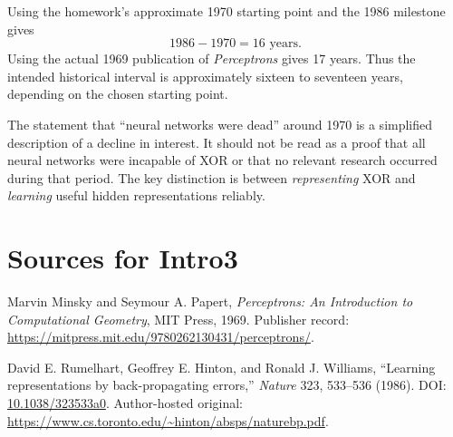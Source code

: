 \documentclass[11pt,a4paper]{article}
\begin{document}
Using the homework's approximate 1970 starting point and the 1986 milestone gives
\[
1986-1970=\boxed{16\text{ years}}.
\]
Using the actual 1969 publication of \emph{Perceptrons} gives 17 years. Thus the intended historical interval is approximately sixteen to seventeen years, depending on the chosen starting point.

The statement that ``neural networks were dead'' around 1970 is a simplified description of a decline in interest. It should not be read as a proof that all neural networks were incapable of XOR or that no relevant research occurred during that period. The key distinction is between \emph{representing} XOR and \emph{learning} useful hidden representations reliably.

\section*{Sources for Intro3}
\begin{enumerate}[label={[\arabic*]}]
\item Marvin Minsky and Seymour A. Papert, \emph{Perceptrons: An Introduction to Computational Geometry}, MIT Press, 1969. Publisher record: \url{https://mitpress.mit.edu/9780262130431/perceptrons/}.
\item David E. Rumelhart, Geoffrey E. Hinton, and Ronald J. Williams, ``Learning representations by back-propagating errors,'' \emph{Nature} 323, 533--536 (1986). DOI: \href{https://doi.org/10.1038/323533a0}{10.1038/323533a0}. Author-hosted original: \url{https://www.cs.toronto.edu/~hinton/absps/naturebp.pdf}.
\end{enumerate}
\end{document}
